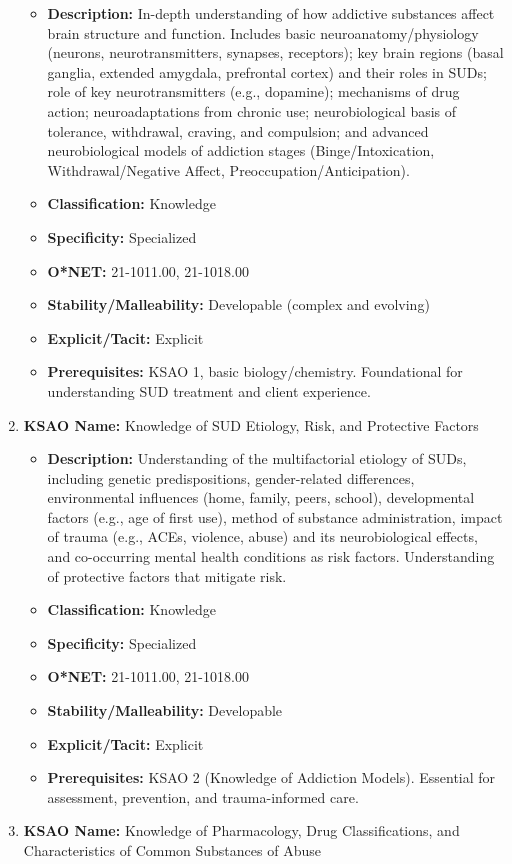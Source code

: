 \documentclass[
  letterpaper,
  DIV=11,
  numbers=noendperiod]{scrartcl}
\providecommand{\tightlist}{%
  \setlength{\itemsep}{0pt}\setlength{\parskip}{0pt}}
\begin{document}
\begin{enumerate}
  \begin{itemize}
  \tightlist
  \item
    \textbf{Description:} In-depth understanding of how addictive
    substances affect brain structure and function. Includes basic
    neuroanatomy/physiology (neurons, neurotransmitters, synapses,
    receptors); key brain regions (basal ganglia, extended amygdala,
    prefrontal cortex) and their roles in SUDs; role of key
    neurotransmitters (e.g., dopamine); mechanisms of drug action;
    neuroadaptations from chronic use; neurobiological basis of
    tolerance, withdrawal, craving, and compulsion; and advanced
    neurobiological models of addiction stages (Binge/Intoxication,
    Withdrawal/Negative Affect, Preoccupation/Anticipation).
  \item
    \textbf{Classification:} Knowledge
  \item
    \textbf{Specificity:} Specialized
  \item
    \textbf{O*NET:} 21-1011.00, 21-1018.00
  \item
    \textbf{Stability/Malleability:} Developable (complex and evolving)
  \item
    \textbf{Explicit/Tacit:} Explicit
  \item
    \textbf{Prerequisites:} KSAO 1, basic biology/chemistry.
    Foundational for understanding SUD treatment and client experience.
  \end{itemize}
\item
  \textbf{KSAO Name:} Knowledge of SUD Etiology, Risk, and Protective
  Factors

  \begin{itemize}
  \tightlist
  \item
    \textbf{Description:} Understanding of the multifactorial etiology
    of SUDs, including genetic predispositions, gender-related
    differences, environmental influences (home, family, peers, school),
    developmental factors (e.g., age of first use), method of substance
    administration, impact of trauma (e.g., ACEs, violence, abuse) and
    its neurobiological effects, and co-occurring mental health
    conditions as risk factors. Understanding of protective factors that
    mitigate risk.
  \item
    \textbf{Classification:} Knowledge
  \item
    \textbf{Specificity:} Specialized
  \item
    \textbf{O*NET:} 21-1011.00, 21-1018.00
  \item
    \textbf{Stability/Malleability:} Developable
  \item
    \textbf{Explicit/Tacit:} Explicit
  \item
    \textbf{Prerequisites:} KSAO 2 (Knowledge of Addiction Models).
    Essential for assessment, prevention, and trauma-informed care.
  \end{itemize}
\item
  \textbf{KSAO Name:} Knowledge of Pharmacology, Drug Classifications,
  and Characteristics of Common Substances of Abuse


\end{enumerate}
\end{document}
